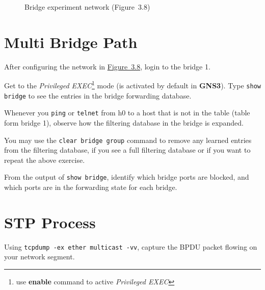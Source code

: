 \documentclass{../UTNetLab}
\begin{document}
\begin{figure}[H]
        \caption{Bridge experiment network (Figure~3.8)}\label{fig:3.8}
    \end{figure}

\section{Multi Bridge Path}
    After configuring the network in \hyperref[fig:3.8]{Figure~3.8}, login to the bridge 1.

    Get to the \textit{Privileged EXEC}\footnote{use \textbf{enable} command to active \textit{Privileged EXEC}} mode (is activated by default in \textbf{GNS3}). Type \lstinline[language={cisco}]{show bridge} to see the entries in the bridge forwarding database.

    Whenever you \lstinline{ping} or \lstinline{telnet} from h0 to a host that is not in the table (table form bridge 1), observe how the filtering database in the bridge is expanded.

    You may use the \lstinline[language={cisco}, emph={group}]{clear bridge group} command to remove any learned entries from the filtering database, if you see a full filtering database or if you want to repeat the above exercise.

    \begin{report}
    \item From the output of \lstinline[language={cisco}]{show bridge}, identify which bridge ports are blocked, and which ports are in the forwarding state for each bridge.
    \end{report}

\section{STP Process}
    Using \lstinline{tcpdump -ex ether multicast -vv}, capture the BPDU packet flowing on your network segment.
\end{document}
